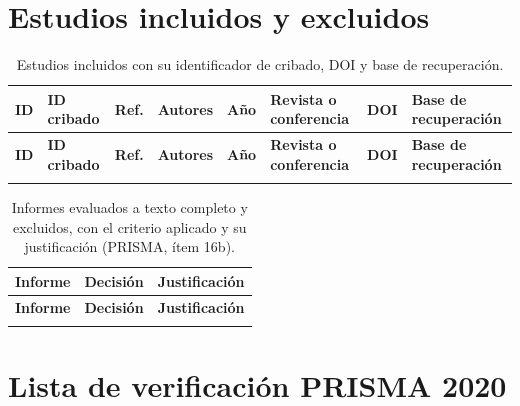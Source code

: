 \documentclass[12pt, a4paper]{article}
\begin{document}
\section*{Estudios incluidos y excluidos}

\begin{landscape}
\footnotesize
\begin{longtable}{lllP{2.8cm}cP{3.0cm}P{5.5cm}P{3.0cm}}
\caption{Estudios incluidos con su identificador de cribado, DOI y base de recuperación.\label{tab:ap_estudios}}\\
\toprule
\textbf{ID} & \textbf{ID cribado} & \textbf{Ref.} & \textbf{Autores} & \textbf{Año} & \textbf{Revista o conferencia} & \textbf{DOI} & \textbf{Base de recuperación} \\
\midrule\endfirsthead
\toprule
\textbf{ID} & \textbf{ID cribado} & \textbf{Ref.} & \textbf{Autores} & \textbf{Año} & \textbf{Revista o conferencia} & \textbf{DOI} & \textbf{Base de recuperación} \\
\midrule\endhead
\bottomrule\endfoot
{}
\end{longtable}
\end{landscape}

\begin{small}
\begin{longtable}{P{4.2cm}P{2.0cm}P{8.2cm}}
\caption{Informes evaluados a texto completo y excluidos, con el criterio aplicado y su justificación (PRISMA, ítem 16b).\label{tab:limite}}\\
\toprule
\textbf{Informe} & \textbf{Decisión} & \textbf{Justificación} \\
\midrule\endfirsthead
\toprule
\textbf{Informe} & \textbf{Decisión} & \textbf{Justificación} \\
\midrule\endhead
\bottomrule\endfoot
{}
\end{longtable}
\end{small}

\section*{Lista de verificación PRISMA 2020}
\end{document}
